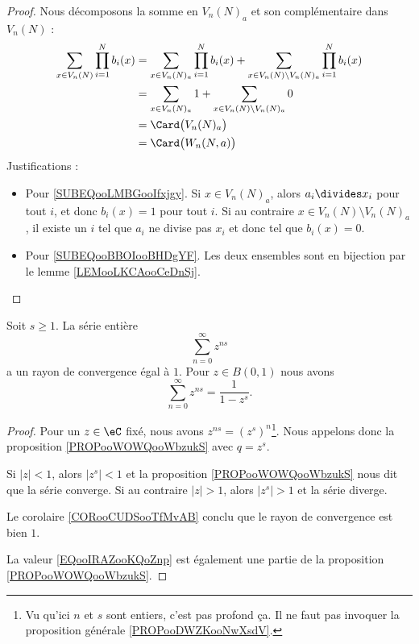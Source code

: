 \begin{proof}
    Nous décomposons la somme en \( V_n(N)_a\) et son complémentaire dans \( V_n(N)\) :
    \begin{subequations}
        \begin{align}
        \sum_{x\in V_n(N)}\prod_{i=1}^Nb_i(x)&=\sum_{x\in V_n(N)_a}\prod_{i=1}^Nb_i(x)+\sum_{x\in V_n(N)\setminus V_n(N)_a}\prod_{i=1}^Nb_i(x)\\
        &=\sum_{x\in V_n(N)_a}1+\sum_{x\in V_n(N)\setminus V_n(N)_a}0       \label{SUBEQooLMBGooIfxjgy}\\
        &=\Card\big( V_n(N)_a \big) \\
        &=\Card\big( W_n(N,a) \big)     \label{SUBEQooBBOIooBHDgYF}
        \end{align}
    \end{subequations}
    Justifications :
    \begin{itemize}
        \item Pour \eqref{SUBEQooLMBGooIfxjgy}.
    Si \( x\in V_n(N)_a\), alors \( a_i\divides x_i\) pour tout \( i\), et donc \( b_i(x)=1\) pour tout \( i\). Si au contraire \( x\in V_n(N)\setminus V_n(N)_a\), il existe un \( i\) tel que \( a_i\) ne divise pas \( x_i\) et donc tel que \( b_i(x)=0\).
\item Pour \eqref{SUBEQooBBOIooBHDgYF}. Les deux ensembles sont en bijection par le lemme \ref{LEMooLKCAooCeDnSj}.
    \end{itemize}
\end{proof}

\begin{lemma}       \label{LEMooRJOKooPJGVTr}
    Soit \( s\geq 1\). La série entière
    \begin{equation}
        \sum_{n=0}^{\infty}z^{ns}
    \end{equation}
    a un rayon de convergence égal à \( 1\). Pour \(z\in B(0,1)\) nous avons
    \begin{equation}        \label{EQooIRAZooKQoZnp}
        \sum_{n=0}^{\infty}z^{ns}=\frac{1}{ 1-z^s }.
    \end{equation}
\end{lemma}

\begin{proof}
    Pour un \( z\in \eC\) fixé, nous avons \( z^{ns}=(z^s)^n\)\footnote{Vu qu'ici \( n\) et \( s\) sont entiers, c'est pas profond ça. Il ne faut pas invoquer la proposition générale \ref{PROPooDWZKooNwXsdV}.}. Nous appelons donc la proposition \ref{PROPooWOWQooWbzukS} avec \( q=z^s\).

    Si \( | z |<1\), alors \( | z^s |<1\) et la proposition \ref{PROPooWOWQooWbzukS} nous dit que la série converge. Si au contraire \( | z |>1\), alors \( | z^s |>1\) et la série diverge.

    Le corolaire \ref{CORooCUDSooTfMvAB} conclu que le rayon de convergence est bien \( 1\).

    La valeur \eqref{EQooIRAZooKQoZnp} est également une partie de la proposition \ref{PROPooWOWQooWbzukS}.
\end{proof}


